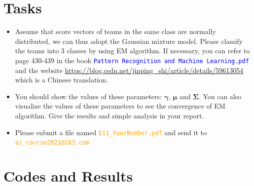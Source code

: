 ﻿\documentclass[a4paper, 11pt]{article}
\numberwithin{equation}{subsection}
\begin{document}
\section{Tasks}
\begin{itemize}
	\item Assume that score vectors of teams in the same class are normally distributed, we can thus adopt the Gaussian mixture model. Please classify the teams into 3 classes by using EM algorithm. If necessary, you can refer to page 430-439 in the book \textcolor{blue}{\texttt{Pattern Recognition and Machine Learning.pdf}} and the website \textcolor{	orange}{\url{https://blog.csdn.net/jinping_shi/article/details/59613054}} which is a Chinese translation.
	\item You should show the values of these parameters: $\boldsymbol\gamma$, $\boldsymbol\mu$ and $\boldsymbol\Sigma$. You can also visualize the values of these parameters to see the convergence of EM algorithm. Give the results and simple analysis in your report.
	\item Please submit a file named \textcolor{orange}{\texttt{E11\_YourNumber.pdf}} and send it to \textcolor{orange}{\texttt{ai\_course2021@163.com}}
\end{itemize}
\section{Codes and Results}


%
%
\end{document}
